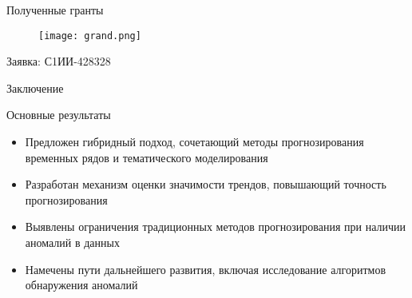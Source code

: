 \documentclass{beamer}
\begin{document}







\begin{frame}{Полученные гранты}


\begin{figure}
\texttt{[image: grand.png]}
\end{figure}

Заявка: С1ИИ-428328

\end{frame}


\begin{frame}{Заключение}
\begin{block}{Основные результаты}
\begin{itemize}
    \item Предложен гибридный подход, сочетающий методы прогнозирования временных рядов и тематического моделирования
    \item Разработан механизм оценки значимости трендов, повышающий точность прогнозирования
    \item Выявлены ограничения традиционных методов прогнозирования при наличии аномалий в данных
    \item Намечены пути дальнейшего развития, включая исследование алгоритмов обнаружения аномалий
\end{itemize}
\end{block}
\end{frame}
\end{document}
